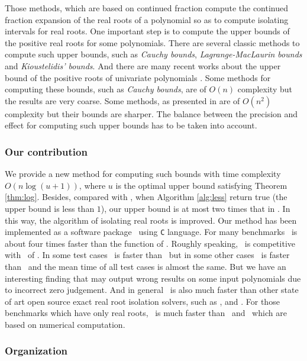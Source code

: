Those methods, which are  based on  continued fraction compute the continued fraction expansion of the real roots of a polynomial so as to  compute isolating intervals for real roots. One important step
is to  compute the upper bounds of the positive real roots for some polynomials. There are  several classic methods to compute such upper bounds, such as {\em Cauchy bounds}, {\em Lagrange-MacLaurin  bounds} and {\em Kioustelidis' bounds}. And there are many recent works about the upper bound of the positive roots of univariate polynomials \cite{hong98,ste05,akr08}. Some methods for computing these bounds,  such as {\em Cauchy bounds}, are of $O(n)$ complexity but the results are very coarse. Some methods, as presented in  \cite{akr08} are of $O(n^2)$ complexity but their bounds are sharper. The balance between the precision and effect for computing such upper bounds has to be taken into account.
\subsubsection{Our contribution}
We provide a new method for computing such bounds with time complexity $O(n\log(u+1))$, where $u$ is the optimal upper bound satisfying Theorem \ref{thm:log}. Besides, compared
with \cite{akr08}, when  Algorithm \ref{alg:less} return true (the upper bound is less than $1$), our upper bound is at most two times that in \cite{akr08}. In this way, the algorithm of   isolating real roots is improved.  Our  method has been implemented as a  software package \froot\ using \texttt{C} language. For many benchmarks \froot \  is about four  times
faster   than  the function {\tt \REALROOT} of \MAPLE. Roughly speaking, \froot\ is competitive with \inte\ of \MM. In some test cases \froot\ is faster than \inte\ but in some other cases \inte\ is faster than \froot\ and the mean time of all test cases is almost the same. But we have an interesting finding that {\tt \inte} may output wrong results on some input polynomials due to incorrect zero judgement. %
And in general \froot\ is also much faster than other state of art
open source exact real root isolation solvers, such as \cf, \AND and \SLV. For those  benchmarks which  have only real roots, \froot\ is much faster than \sle\ and \eign\ which are based on numerical computation.

\subsubsection{Organization}

